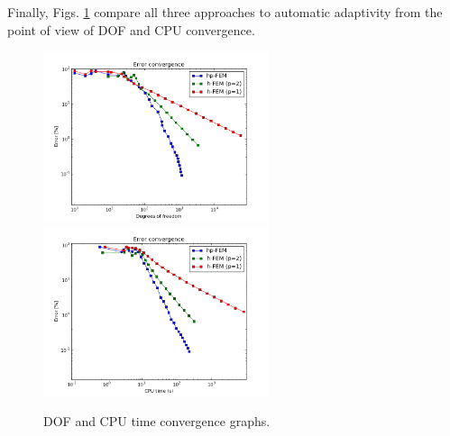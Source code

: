 Finally, Figs. \ref{fig:nist-8-conv} compare all
three approaches to automatic adaptivity from the point
of view of DOF and CPU convergence.

\begin{figure}[!ht]
\centering
\includegraphics[height=5cm]{nist/nist-8/conv_dof_aniso.png}\ \
\includegraphics[height=5cm]{nist/nist-8/conv_cpu_aniso.png}
\caption{DOF and CPU time convergence graphs.}
\label{fig:nist-8-conv}
\end{figure}


